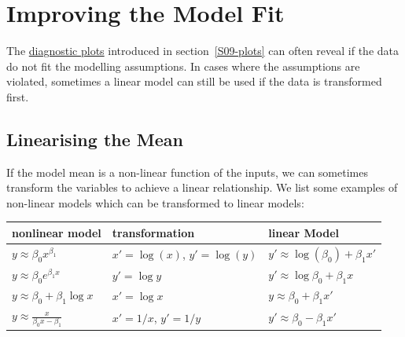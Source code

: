 \documentclass[
  a4paper,
]{article}
\theoremstyle{definition}
\theoremstyle{definition}
\theoremstyle{definition}
\theoremstyle{definition}
\theoremstyle{remark}
\begin{document}
\clearpage

\section{Improving the Model Fit}\label{S11-improving}

The \hyperref[S09-plots]{diagnostic plots} introduced in section~\ref{S09-plots}
can often reveal if the data do not fit the modelling assumptions.
In cases where the assumptions are violated, sometimes a linear
model can still be used if the data is transformed first.

\subsection{Linearising the Mean}\label{linearising-the-mean}

If the model mean is a non-linear function of the inputs, we
can sometimes transform the variables to achieve a linear relationship.
We list some examples of non-linear models which can be transformed
to linear models:

{\def\LTcaptype{} %
\begin{longtable}[]{@{}
  >{\raggedright\arraybackslash}p{}
  >{\raggedright\arraybackslash}p{}
  >{\raggedright\arraybackslash}p{}@{}}
\toprule\noalign{}
\begin{minipage}[b]{\linewidth}\raggedright
nonlinear model
\end{minipage} & \begin{minipage}[b]{\linewidth}\raggedright
transformation
\end{minipage} & \begin{minipage}[b]{\linewidth}\raggedright
linear Model
\end{minipage} \\
\midrule\noalign{}
\endhead
\bottomrule\noalign{}
\endlastfoot
\(y \approx \beta_0 x^{\beta_1}\) & \(x'=\log(x)\), \(y'=\log(y)\) & \(y' \approx \log(\beta_0) + \beta_1 x'\) \\
\(y \approx \beta_0 e^{\beta_1 x}\) & \(y'=\log y\) & \(y' \approx \log \beta_0 +\beta_1 x\) \\
\(y \approx \beta_0+\beta_1\log x\) & \(x'=\log x\) & \(y \approx \beta_0+\beta_1 x'\) \\
\(y \approx \frac{x}{\beta_0 x-\beta_1}\) & \(x'=1/x\), \(y'=1/y\) & \(y' \approx \beta_0-\beta_1 x'\) \\
\end{longtable}
}
\end{document}
